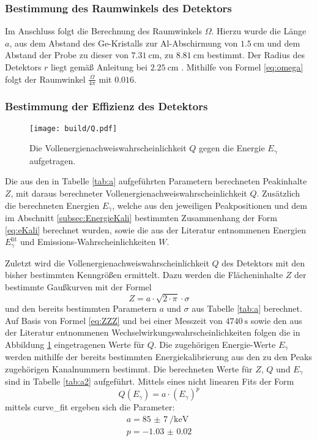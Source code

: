 \subsubsection{Bestimmung des Raumwinkels des Detektors}
Im Anschluss folgt die Berechnung des Raumwinkels $\Omega$. Hierzu wurde die Länge $a$, aus dem Abstand des Ge-Kristalls zur Al-Abschirmung von $\SI{1.5}{\centi\meter}$ und dem Abstand der Probe zu dieser von $\SI{7.31}{\centi\meter}$, zu $\SI{8.81}{\centi\meter}$ bestimmt. Der Radius des Detektors $r$ liegt gemäß Anleitung bei $\SI{2.25}{\centi\meter}$ \cite{V18}. Mithilfe von Formel \eqref{eq:omega} folgt der Raumwinkel $\frac{\Omega}{4 \pi}$ mit $\num{0.016}$.


\subsubsection{Bestimmung der Effizienz des Detektors}
\begin{figure}
	\centering
	\texttt{[image: build/Q.pdf]}
	\caption{Die Vollenergienachweiswahrscheinlichkeit $Q$ gegen die Energie $E_\gamma$ aufgetragen.}
	\label{fig:Q}
\end{figure}
\begin{table}
	\centering
	\caption{Die aus den in Tabelle \ref{tab:a} aufgeführten Parametern berechneten Peakinhalte $Z$, mit daraus berechneter Vollenergienachweiswahrscheinlichkeit $Q$. Zusätzlich die berechneten Energien $E_\gamma$, welche aus den jeweiligen Peakpositionen und dem im Abschnitt \ref{subsec:EnergieKali} bestimmten Zusammenhang der Form \eqref{eq:eKali} berechnet wurden, sowie die aus der Literatur entnommenen Energien $E_\gamma^\text{lit}$ und Emissions-Wahrscheinlichkeiten $W$.}
	
\end{table}
Zuletzt wird die Vollenergienachweiswahrscheinlichkeit $Q$ des Detektors mit den bisher bestimmten Kenngrößen ermittelt. Dazu werden die Flächeninhalte $Z$ der bestimmte Gaußkurven mit der Formel 
\begin{equation}
    Z = a \cdot \sqrt{2 \cdot \pi} \cdot \sigma \label{eq:flach}
\end{equation}
und den bereits bestimmten Parametern $a$ und $\sigma$ aus Tabelle \ref{tab:a} berechnet. Auf Basis von Formel \eqref{eq:ZZZ} und bei einer Messzeit von $\SI{4740}{\second}$ sowie den aus der Literatur entnommenen Wechselwirkungswahrscheinlichkeiten \cite{MARTIN20131497} folgen die in Abbildung \ref{fig:Q} eingetragenen Werte für $Q$. Die zugehörigen Energie-Werte $E_\gamma$ werden mithilfe der bereits bestimmten Energiekalibrierung aus den zu den Peaks zugehörigen Kanalnummern bestimmt. Die berechneten Werte für $Z$, $Q$ und $E_\gamma$ sind in Tabelle \ref{tab:a2} aufgeführt. Mittels eines nicht linearen Fits der Form 
\begin{equation}
	Q(E_\gamma)=a \cdot (E_\gamma)^p
\end{equation}
mittels curve\_fit \cite{scipy} ergeben sich die Parameter:
\begin{gather*}
    a = \SI{85(7)}{\per\kilo\electronvolt}\\
    p = \num{-1.03(2)}
\end{gather*}


